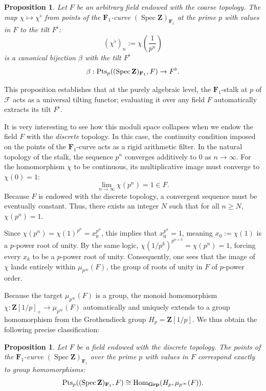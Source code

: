 \documentclass[11pt,a4paper]{article}
\newtheorem{proposition}[theorem]{Proposition}
\newcommand{\Z}{\mathbf{Z}}
\newcommand{\Fone}{\mathbf{F}_{1}}
\def\spzf{(\Spec \Z)_{\mathbf{F}_{1}}}
\newcommand{\Pt}{{\rm Pts}}
\newcommand{\Hom}{{\rm{Hom}}}
\newcommand{\Spec}{\operatorname{Spec}}
\newcommand{\Grp}{\rm{\bf{Grp}}}
\begin{document}
\begin{proposition}\label{propflat}
Let $F$ be an arbitrary field endowed with the coarse topology. The map $\chi\mapsto  \chi^\flat$  from points of the $\Fone$-curve $\spzf$ at the prime $p$ with values in $F$ to the tilt $F^\flat$: 
\begin{equation}\label{flatmap}
(\chi^\flat)_n:=\chi\left(\frac{1}{p^n}\right)
\end{equation}
is a canonical  bijection $\beta$ with the tilt $F^\flat$
\begin{equation}\label{flatmap}
\beta: \Pt_p(\spzf,F)\to F^\flat.
\end{equation}
\end{proposition}

This proposition establishes that at the purely algebraic level, the $\Fone$-stalk at $p$ of $\mathcal F$ acts as a universal tilting functor; evaluating it over any field $F$ automatically extracts its tilt $F^\flat$. 

It is very interesting to see how this moduli space collapses when we endow the field $F$ with the \emph{discrete} topology. In this case, the continuity condition imposed on the points of the $\Fone$-curve acts as a rigid arithmetic filter. In the natural topology of the stalk, the sequence $p^n$ converges additively to $0$ as $n \to \infty$. For the homomorphism $\chi$ to be continuous, its multiplicative image must converge to $\chi(0) = 1$:
\[
\lim_{n \to \infty} \chi(p^n) = 1 \in F.
\]
Because $F$ is endowed with the discrete topology, a convergent sequence must be eventually constant. Thus, there exists an integer $N$ such that for all $n \ge N$, $\chi(p^n) = 1$. 

Since $\chi(p^n) = \chi(1)^{p^n} = x_0^{p^n}$, this implies that $x_0^{p^n} = 1$, meaning $x_0:=\chi(1)$ is a $p$-power root of unity. By the same logic, $\chi(1/p^k)^{p^{n+k}} = \chi(p^n) = 1$, forcing every $x_k$ to be a $p$-power root of unity. Consequently, one sees that the image of $\chi$ lands entirely within $\mu_{p^\infty}(F)$, the group of roots of unity in $F$ of $p$-power order. 

Because the target $\mu_{p^\infty}(F)$ is a group, the monoid homomorphism $\chi : \Z[1/p]_+ \to \mu_{p^\infty}(F)$ automatically and uniquely extends to a group homomorphism from the Grothendieck group $H_p = \Z[1/p]$. We thus obtain the following precise classification:

\begin{proposition}
Let $F$ be a field endowed with the discrete topology. The  points of the $\Fone$-curve $\spzf$ over the prime $p$ with values in $F$ correspond exactly to group homomorphisms:
\[
 \Pt_p(\spzf,F)\cong\Hom_{\Grp}(H_p,\mu_{p^\infty}(F)).
\]
\end{proposition}
\end{document}
